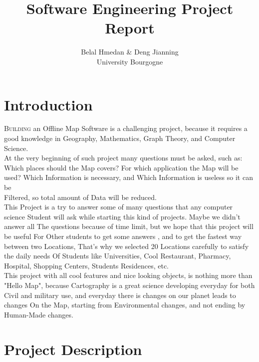 \documentclass[a4paper,english]{book}
\title{\textbf{Software Engineering Project Report}}
\begin{document}
\author{Belal Hmedan \& Deng Jianning\\University Bourgogne}
\maketitle
\let\cleardoublepage\clearpage
\tableofcontents
\chapter*{Introduction}
 
\lettrine{B}{uilding} an Offline Map Software is a challenging project, because it requires a good knowledge in Geography, Mathematics, Graph Theory, and Computer Science.
\\At the very beginning of such project many questions must be asked, such as: \\Which places should the Map covers? For which application the Map will be used?
Which Information is necessary, and Which Information is useless so it can be \\Filtered, so total amount of Data will be reduced.
\\This Project is a try to answer some of many questions that any computer science Student will ask while starting this kind of projects. Maybe we didn't answer all The questions because of time limit, but we hope that this project will be useful For Other students to get some answers , and to get the fastest way between two Locations, That's why we selected 20 Locations carefully to satisfy the daily needs Of Students like Universities, Cool Restaurant, Pharmacy, Hospital, Shopping Centers, Students Residences, etc.
\\This project with all cool features and nice looking objects, is nothing more than "Hello Map", because Cartography is a great science developing everyday for both Civil and military use, and everyday there is changes on our planet leads to changes On the Map, starting from Environmental changes, and not ending by Human-Made changes. 

\chapter{Project Description}
\end{document}
